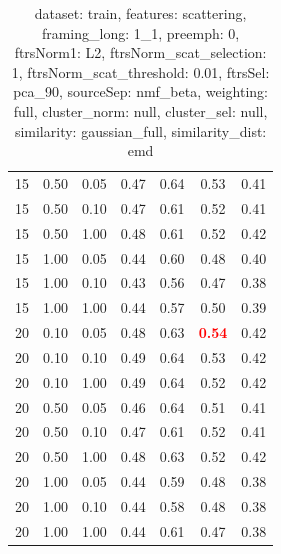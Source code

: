 \documentclass[12pt,a4paper,fleqn]{tufte-handout}
\begin{document}
\begin{table}
\begin{center}
\begin{tabular}{lllcccc}
15 & 0.50 & 0.05 & 0.47 & 0.64 & 0.53 & 0.41 \\             
15 & 0.50 & 0.10 & 0.47 & 0.61 & 0.52 & 0.41 \\             
15 & 0.50 & 1.00 & 0.48 & 0.61 & 0.52 & 0.42 \\             
15 & 1.00 & 0.05 & 0.44 & 0.60 & 0.48 & 0.40 \\             
15 & 1.00 & 0.10 & 0.43 & 0.56 & 0.47 & 0.38 \\             
15 & 1.00 & 1.00 & 0.44 & 0.57 & 0.50 & 0.39 \\             
20 & 0.10 & 0.05 & 0.48 & 0.63 & \textbf{\textcolor{red}{0.54}} & 0.42 \\             
20 & 0.10 & 0.10 & 0.49 & 0.64 & 0.53 & 0.42 \\             
20 & 0.10 & 1.00 & 0.49 & 0.64 & 0.52 & 0.42 \\             
20 & 0.50 & 0.05 & 0.46 & 0.64 & 0.51 & 0.41 \\             
20 & 0.50 & 0.10 & 0.47 & 0.61 & 0.52 & 0.41 \\             
20 & 0.50 & 1.00 & 0.48 & 0.63 & 0.52 & 0.42 \\             
20 & 1.00 & 0.05 & 0.44 & 0.59 & 0.48 & 0.38 \\             
20 & 1.00 & 0.10 & 0.44 & 0.58 & 0.48 & 0.38 \\             
20 & 1.00 & 1.00 & 0.44 & 0.61 & 0.47 & 0.38 \\             
\end{tabular}             
\end{center}             
\caption{dataset: train, features: scattering, framing\_long: 1\_1, preemph: 0, ftrsNorm1: L2, ftrsNorm\_scat\_selection: 1, ftrsNorm\_scat\_threshold: 0.01, ftrsSel: pca\_90, sourceSep: nmf\_beta, weighting: full, cluster\_norm: null, cluster\_sel: null, similarity: gaussian\_full, similarity\_dist: emd}             
\label{datasetrFeaturscFraminlong1_1Preemp0Ftrsnorm1L2Ftrsnoscatselect1Ftrsnoscatthresh0.01Ftrsselpc90SourcesepnmbeWeightfuClustenormnuClusteselnuSimilagafuSimiladistem}             
\end{table}             
 
\end{document}
